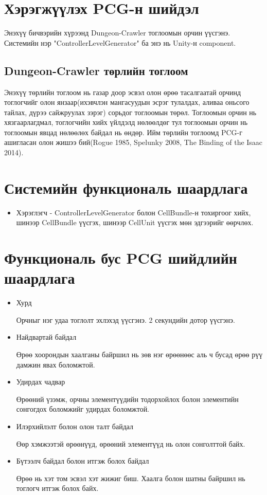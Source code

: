 \section{Хэрэгжүүлэх PCG-н шийдэл}
Энэхүү бичвэрийн хүрээнд Dungeon-Crawler тоглоомын орчин үүсгэнэ. Системийн нэр "ControllerLevelGenerator" ба энэ нь Unity-н component.
\subsection{Dungeon-Crawler төрлийн тоглоом}
Энэхүү төрлийн тоглоом нь газар доор эсвэл олон өрөө тасалгаатай орчинд тоглогчийг олон янзаар(ихэвчлэн мангасуудын эсрэг тулалдах, аливаа оньсого тайлах, дүрээ сайжруулах зэрэг) сорьдог тоглоомын төрөл.  Тоглоомын орчин нь хязгаарлагдмал, тоглогчийн хийх үйлдэлд нөлөөлдөг тул тоглоомын орчин нь тоглоомын явцад нөлөөлөх байдал нь өндөр. Ийм төрлийн тоглоомд PCG-г ашигласан олон жишээ бий(Rogue 1985, Spelunky 2008, The Binding of the Isaac 2014).

\section{Системийн функциональ шаардлага}
\begin{itemize}
	\item Хэрэглэгч - ControllerLevelGenerator болон CellBundle-н тохиргоог хийх, шинээр CellBundle үүсгэх, шинээр CellUnit үүсгэх мөн эдгээрийг өөрчлөх.
\end{itemize}

\section{Функциональ бус PCG шийдлийн шаардлага}
\begin{itemize}
	\item Хурд

	      Орчныг нэг удаа тоглолт эхлэхэд үүсгэнэ. 2 секундийн дотор үүсгэнэ.
	\item Найдвартай байдал

	      Өрөө хоорондын хаалганы байршил нь зөв нэг өрөөнөөс аль ч бусад өрөө рүү дамжин явах боломжтой.
	\item Удирдах чадвар

	      Өрөөний үзэмж, орчны элементүүдийн тодорхойлох болон элементийн сонгогдох боломжийг удирдах боломжтой.
	\item Илэрхийлэлт болон олон талт байдал

	      Өөр хэмжээтэй өрөөнүүд, өрөөний элементүүд нь олон сонголттой байх.
	\item Бүтээлч байдал болон итгэж болох байдал

	      Өрөө нь хэт том эсвэл хэт жижиг биш. Хаалга болон шатны байршил нь тоглогч итгэж болох байх.
\end{itemize}

